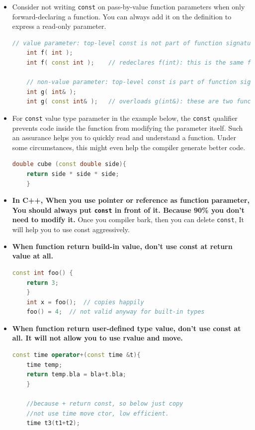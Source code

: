 \documentclass[a4paper,12pt,twoside]{book}
\begin{document}
\begin{itemize}
	\item  Consider not writing \texttt{const} on pass-by-value function parameters when only forward-declaring a function. You can always add it on the definition to express a read-only parameter.
	\begin{lstlisting}[frame=single, language=c++]
	// value parameter: top-level const is not part of function signature
	int f( int );
	int f( const int );    // redeclares f(int): this is the same function
	
	// non-value parameter: top-level const is part of function signature
	int g( int& );
	int g( const int& );   // overloads g(int&): these are two functions
	\end{lstlisting}
	
	\item For \texttt{const} value type parameter in the example below, the \texttt{const} qualifier prevents code inside the function from modifying the parameter itself. Such an assurance helps you to quickly read and understand a function. Under some circumstances, this might even help the compiler generate better code. 
	\begin{lstlisting}[frame=single, language=c++]
	double cube (const double side){
	return side * side * side;
	}
	\end{lstlisting}
	
	\item \textbf{In C++, When you use pointer or reference as function parameter, You should always put \texttt{const} in front of it. Because 90\% you don't need to modify it. } Once you compiler bark, then you can delete \texttt{const}, It will help you to use const aggressively.
	
	\item \textbf{When function return build-in value, don't use const at return value at all. }
	\begin{lstlisting}[frame=single, language=c++]
	const int foo() {
	return 3;
	}
	int x = foo();  // copies happily
	foo() = 4;  // not valid anyway for built-in types
	\end{lstlisting}
	
	\item \textbf{When function return user-defined type value, don't use const at all. It will not allow you to use rvalue and move. }
	\begin{lstlisting}[frame=single, language=c++]
	const time operator+(const time &t){
	time temp;
	return temp.bla = bla+t.bla;
	}
	
	//because + return const, so below just copy
	//not use time move ctor, low efficient.
	time t3(t1+t2);
	\end{lstlisting}
	

\end{itemize}
\end{document}
